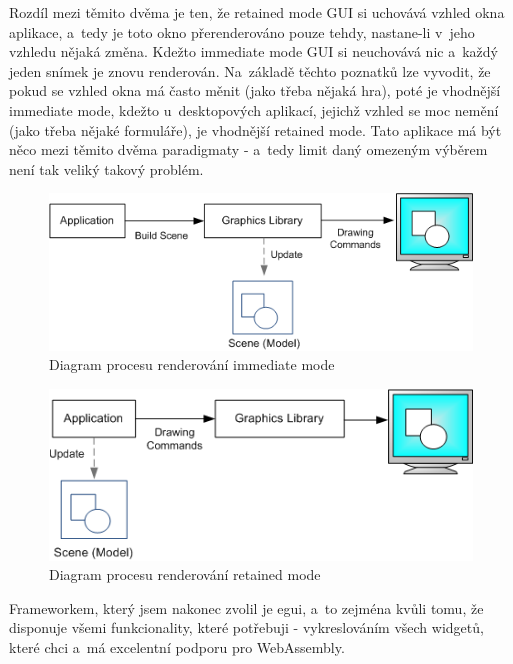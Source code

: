 \documentclass[a4paper, 12pt, twoside]{article} %
\begin{document}
		Rozdíl mezi těmito dvěma je ten, že retained mode GUI si uchovává vzhled okna aplikace, a~tedy je toto okno přerenderováno pouze tehdy, nastane-li v~jeho vzhledu nějaká změna. Kdežto immediate mode GUI si neuchovává nic a~každý jeden snímek je znovu renderován. Na~základě těchto poznatků lze vyvodit, že pokud se vzhled okna má často měnit (jako třeba nějaká hra), poté je vhodnější immediate mode, kdežto u~desktopových aplikací, jejichž vzhled se moc nemění (jako třeba nějaké formuláře), je vhodnější retained mode. Tato aplikace má být něco mezi těmito dvěma paradigmaty - a~tedy limit daný omezeným výběrem není tak veliký takový problém.
		\begin{center}
			\begin{figure}[H]
				\centering
				\includegraphics[width=.82\linewidth]{imm_mod}
				\caption{Diagram procesu renderování immediate mode\cite{imm_mod}}
				\label{fig:imm_mod}
			\end{figure}
		\end{center}
		\begin{center}
			\begin{figure}[H]
				\centering
				\includegraphics[width=.82\linewidth]{ret_mod}
				\caption{Diagram procesu renderování retained mode\cite{ret_mod}}
				\label{fig:ret_mod}
			\end{figure}
		\end{center}
		
		Frameworkem, který jsem nakonec zvolil je egui, a~to zejména kvůli tomu, že disponuje všemi funkcionality, které potřebuji - vykreslováním všech widgetů, které chci a~má excelentní podporu pro WebAssembly.\cite{egui}
	
\end{document}
